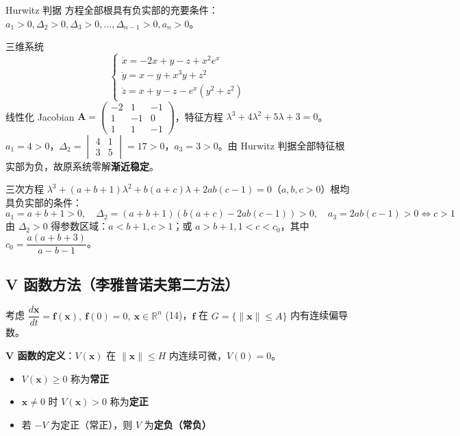 \begin{myTheorem}{Hurwitz 判据}
方程全部根具有负实部的充要条件：$a_1 > 0, \Delta_2 > 0, \Delta_3 > 0, \ldots, \Delta_{n-1} > 0, a_n > 0$。
\end{myTheorem}

\begin{example}
三维系统
$$\begin{cases} \dot{x} = -2x + y - z + x^2e^x \\ \dot{y} = x - y + x^3y + z^2 \\ \dot{z} = x + y - z - e^x(y^2 + z^2) \end{cases}$$
线性化 Jacobian $\mathbf{A} = \begin{pmatrix} -2 & 1 & -1 \\ 1 & -1 & 0 \\ 1 & 1 & -1 \end{pmatrix}$，特征方程 $\lambda^3 + 4\lambda^2 + 5\lambda + 3 = 0$。$a_1 = 4 > 0$，$\Delta_2 = \begin{vmatrix} 4 & 1 \\ 3 & 5 \end{vmatrix} = 17 > 0$，$a_3 = 3 > 0$。由 Hurwitz 判据全部特征根实部为负，故原系统零解\textbf{渐近稳定}。
\end{example}

\begin{example}
三次方程 $\lambda^3 + (a+b+1)\lambda^2 + b(a+c)\lambda + 2ab(c-1) = 0$（$a, b, c > 0$）根均具负实部的条件：
$$a_1 = a+b+1 > 0, \quad \Delta_2 = (a+b+1)(b(a+c) - 2ab(c-1)) > 0, \quad a_3 = 2ab(c-1) > 0 \iff c > 1$$
由 $\Delta_2 > 0$ 得参数区域：$a < b+1, c > 1$；或 $a > b+1, 1 < c < c_0$，其中 $c_0 = \dfrac{a(a+b+3)}{a-b-1}$。
\end{example}

\subsection{V 函数方法（李雅普诺夫第二方法）}

考虑 $\dfrac{d\mathbf{x}}{dt} = \mathbf{f}(\mathbf{x}), \ \mathbf{f}(0) = 0, \ \mathbf{x} \in \mathbb{R}^n$ (14)，$\mathbf{f}$ 在 $G = \{\|\mathbf{x}\| \le A\}$ 内有连续偏导数。

\textbf{V 函数的定义}：$V(\mathbf{x})$ 在 $\|\mathbf{x}\| \le H$ 内连续可微，$V(0) = 0$。
\begin{itemize}
    \item $V(\mathbf{x}) \ge 0$ 称为\textbf{常正}
    \item $\mathbf{x} \neq 0$ 时 $V(\mathbf{x}) > 0$ 称为\textbf{定正}
    \item 若 $-V$ 为定正（常正），则 $V$ 为\textbf{定负（常负）}
\end{itemize}

